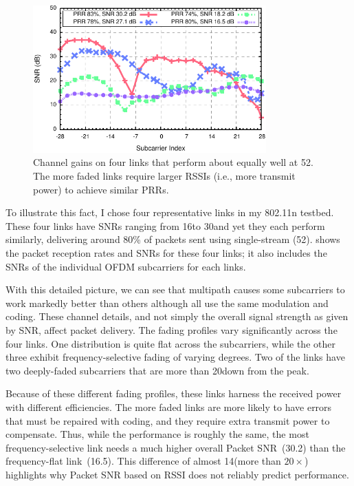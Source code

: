\begin{figure}[t]
  \centering
  \includegraphics[width=0.8\textwidth]{figures/approach/fsf_shape.pdf}
  \caption[Channel gains on four links that perform about equally well at 52\Mbps]{Channel gains on four links that perform about equally well at 52\Mbps. The more faded links require larger RSSIs (i.e., more transmit power) to achieve similar PRRs.}
  \label{fig:example_fsf_shape}

\end{figure}

To illustrate this fact, I chose four representative links in my 802.11n testbed. These four links have SNRs ranging from 16\dB to 30\dB and yet they each perform similarly, delivering around 80\% of packets sent using single-stream  (52\Mbps).  shows the packet reception rates and SNRs for these four links; it also includes the SNRs of the individual OFDM subcarriers for each links.

With this detailed picture, we can see that multipath causes some subcarriers to work markedly better than others although all use the same modulation and coding. These channel details, and not simply the overall signal strength as given by SNR, affect packet delivery. The fading profiles vary significantly across the four links. One distribution is quite flat across the subcarriers, while the other three exhibit frequency-selective fading of varying degrees. Two of the links have two deeply-faded subcarriers that are more than 20\dB down from the peak.

Because of these different fading profiles, these links harness the received power with different efficiencies.
The more faded links are more likely to have errors that must be repaired with coding, and they require extra transmit power to compensate. Thus, while the performance is roughly the same, the most frequency-selective link needs a much higher overall Packet SNR~(30.2\dB) than the frequency-flat link~(16.5\dB). This difference of almost 14\dB (more than $20\times$) highlights why Packet SNR based on RSSI does not reliably predict performance.

